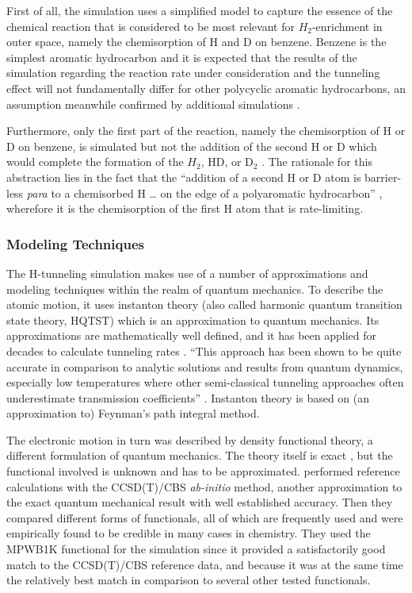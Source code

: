 \documentclass[12pt, a4paper]{article}
\numberwithin{equation}{section}
\begin{document}
First of all, the simulation uses a simplified model to capture the
essence of the chemical reaction that is considered to be most relevant
for $H_2$-enrichment in outer space, namely the chemisorption of H and
D on benzene. Benzene is the simplest aromatic hydrocarbon and it is
expected that the results of the simulation regarding the reaction rate
under consideration and the tunneling effect will not fundamentally
differ for other polycyclic aromatic hydrocarbons, an assumption
meanwhile confirmed by additional simulations \citep{goumans:2011}.

Furthermore, only the first part of the reaction, namely the
chemisorption of H or D on benzene, is simulated but not the addition of
the second H or D which would complete the formation of the $H_2$, HD,
or D$_2$ . The rationale for this abstraction lies in the fact that the
``addition of a second H or D atom is barrier-less {\em para} to a
chemisorbed H \ldots{} on the edge of a polyaromatic hydrocarbon''
\cite[p. 7351]{goumans-kaestner:2010}, wherefore it is the chemisorption
of the first H atom that is rate-limiting.


\subsubsection{Modeling Techniques}

The H-tunneling simulation makes use of a number of approximations and
modeling techniques within the realm of quantum mechanics. To describe
the atomic motion, it uses instanton theory (also called harmonic
quantum transition state theory, HQTST) which is an approximation to
quantum mechanics. Its approximations are mathematically well defined,
and it has been applied for decades to calculate tunneling rates
\citep{vai82,tak99}. ``This approach has been shown to be quite accurate
in comparison to analytic solutions and results from quantum dynamics,
especially low temperatures where other semi-classical tunneling
approaches often underestimate transmission coefficients'' \cite[p.
7350]{goumans-kaestner:2010}. Instanton theory is based on (an
approximation to) Feynman's path integral method.

The electronic motion in turn was described by density functional
theory, a different formulation of quantum mechanics. The theory itself is exact
\citep{hoh64}, but the functional involved is unknown and has to be
approximated. \citet{goumans-kaestner:2010} performed reference calculations
with the CCSD(T)/CBS \emph{ab-initio} method, another approximation to the
exact quantum mechanical result with well established accuracy.  Then they
compared different forms of functionals, all of which are frequently used
and were empirically found to be credible in many cases in chemistry.  They
used the MPWB1K functional for the simulation since it provided a
satisfactorily good match to the CCSD(T)/CBS reference data, and
because it was at the same time the relatively best match in
comparison to several other tested functionals.
\end{document}
